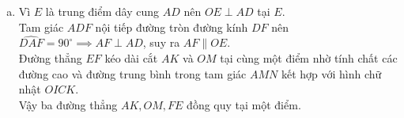 \begin{bt}
{\begin{enumerate}[a)]
	Mặt khác, $K$ là trung điểm của $BC$ và $ON \perp BC$, áp dụng các hệ thức tam giác đồng dạng ta suy ra tỉ số $\dfrac{ND}{NO} = \dfrac{NK}{NA}$, dẫn đến $\Delta NDK \backsim \Delta NOA$ (c-g-c).\\
	Do đó $\widehat{NDK} = \widehat{NOA}$.
	\item Vì $E$ là trung điểm dây cung $AD$ nên $OE \perp AD$ tại $E$.\\
	Tam giác $ADF$ nội tiếp đường tròn đường kính $DF$ nên $\widehat{DAF} = 90^\circ \implies AF \perp AD$, suy ra $AF \parallel OE$.\\
	Đường thẳng $EF$ kéo dài cắt $AK$ và $OM$ tại cùng một điểm nhờ tính chất các đường cao và đường trung bình trong tam giác $AMN$ kết hợp với hình chữ nhật $OICK$.\\
	Vậy ba đường thẳng $AK, OM, FE$ đồng quy tại một điểm.
\end{enumerate}
}
\end{bt}


